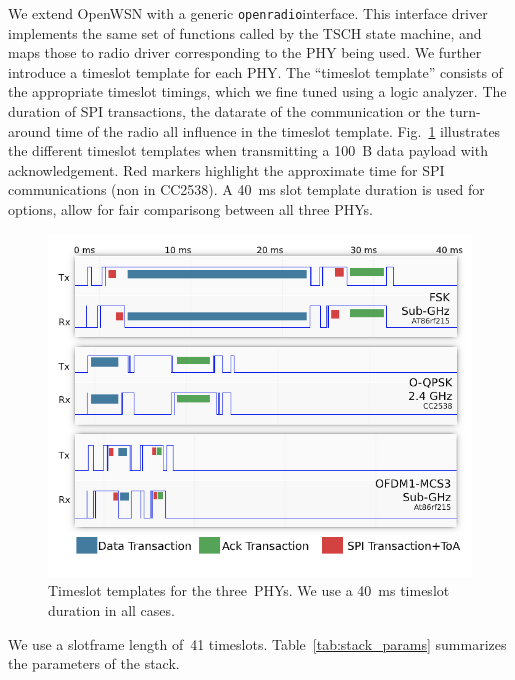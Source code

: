 \documentclass[sensors,article,submit,moreauthors,pdftex]{Definitions/mdpi}
\newcommand{\openradio}     {\texttt{openradio}}
\newcommand{\figwidth}      {0.85}
\begin{document}

We extend OpenWSN with a generic \openradio interface.
This interface driver implements the same set of functions called by the TSCH state machine, and maps those to radio driver corresponding to the PHY being used.
We further introduce a timeslot template for each PHY.
The ``timeslot template'' consists of the appropriate timeslot timings, which we fine tuned using a logic analyzer.
The duration of SPI transactions, the datarate of the communication or the turn-around time of the radio all influence in the timeslot template.
Fig.~\ref{fig:timeslot_templates} illustrates the different timeslot templates when transmitting a 100~B data payload with acknowledgement.
Red markers highlight the approximate time for SPI communications (non in CC2538).
A 40~ms slot template duration is used for options, allow for fair comparisong between all three PHYs.

\begin{figure}
	\centering
	\includegraphics[width=\figwidth\columnwidth]{timeslot_templates}
	\caption{
	    Timeslot templates for the three~PHYs.
	    We use a 40~ms timeslot duration in all cases.
	}
    \label{fig:timeslot_templates}
\end{figure}


We use a slotframe length of~41 timeslots.
Table~\ref{tab:stack_params} summarizes the parameters of the stack.
\end{document}
